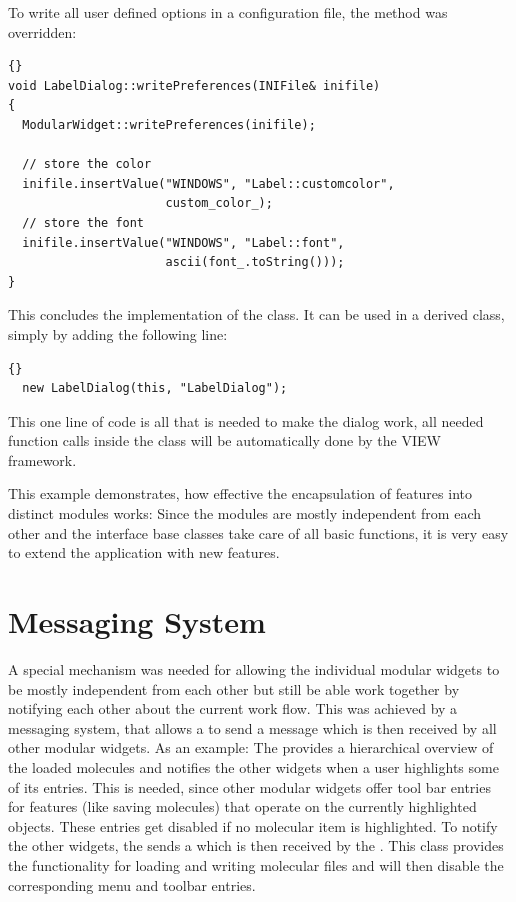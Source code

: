 \noindent
To write all user defined options in a configuration file, the method
 was overridden:

\begin{lstlisting}{}
void LabelDialog::writePreferences(INIFile& inifile)
{
  ModularWidget::writePreferences(inifile);

  // store the color
  inifile.insertValue("WINDOWS", "Label::customcolor",
                      custom_color_);
  // store the font
  inifile.insertValue("WINDOWS", "Label::font",
                      ascii(font_.toString()));
}
\end{lstlisting}

\noindent
This concludes the implementation of the  class. It can be
used in a derived  class, simply by adding the following 
line:

\begin{lstlisting}{}
  new LabelDialog(this, "LabelDialog");
\end{lstlisting}

\noindent
This one line of code is all that is needed to make the dialog work, all needed
function calls inside the  class will be automatically done
by the VIEW framework.

This example demonstrates, how effective the encapsulation of features into 
distinct modules works: Since the modules are mostly independent from each 
other and the interface base classes take care of all basic functions, it is 
very easy to extend the application with new features.


\section{Messaging System}
\label{message}

A special mechanism was needed for allowing the individual modular widgets to
be mostly independent from each other but still be able work together \ie by
notifying each other about the current work flow. This was achieved by a 
messaging system, that allows a  to send a message which
is then received by all other modular widgets. As an example: The 
 provides a hierarchical overview of the loaded 
molecules and notifies the other widgets when a user highlights some of its 
entries. This is needed, since other modular widgets offer tool bar entries 
for features (like saving molecules) that operate on the currently highlighted 
objects. These entries get disabled if no molecular item is highlighted. To 
notify the other widgets, the  sends a 
 which is then received by the 
. This class provides the functionality for 
loading and writing molecular files and will then disable the corresponding 
menu and toolbar entries.

